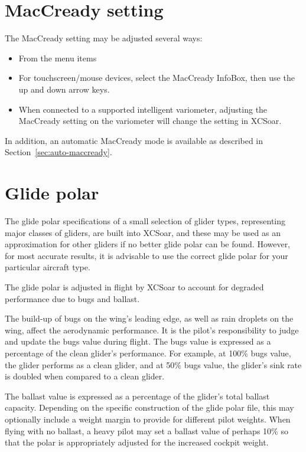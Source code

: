 \documentclass[a4paper,12pt]{refrep}
\begin{document}
\section{MacCready setting}

The MacCready setting may be adjusted several ways:
\begin{itemize}
\item From the menu items
\begin{quote}
\blink{} 

\blink{}
\end{quote}
\item For touchscreen/mouse devices, select the MacCready InfoBox, then
  use the up and down arrow keys.
\item When connected to a supported intelligent variometer, adjusting
  the MacCready setting on the variometer will change the setting
  in XCSoar.
\end{itemize}
In addition, an automatic MacCready mode is available as described in
Section~\ref{sec:auto-maccready}.

\section{Glide polar}

The glide polar specifications of a small selection of glider types,
representing major classes of gliders, are built into XCSoar, and
these may be used as an approximation for other gliders if no better
glide polar can be found.  However, for most accurate results, it is
advisable to use the correct glide polar for your particular aircraft
type.

The glide polar is adjusted in flight by XCSoar to account for
degraded performance due to bugs and ballast.

The build-up of bugs on the wing's leading edge, as well as rain
droplets on the wing, affect the aerodynamic performance.  It is the
pilot's responsibility to judge and update the bugs value during
flight.  The bugs value is expressed as a percentage of the clean
glider's performance.  For example, at 100\% bugs value, the glider
performs as a clean glider, and at 50\% bugs value, the glider's sink
rate is doubled when compared to a clean glider.



The ballast value is expressed as a percentage of the glider's total
ballast capacity.  Depending on the specific construction of the glide
polar file, this may optionally include a weight margin to provide for
different pilot weights.  When flying with no ballast, a heavy pilot
may set a ballast value of perhaps 10\% so that the polar is
appropriately adjusted for the increased cockpit weight.
\end{document}

